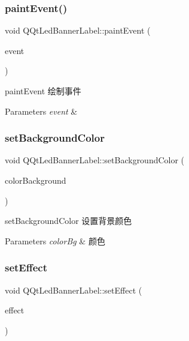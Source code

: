 \subsubsection{\texorpdfstring{paint\+Event()}{paintEvent()}}
{\footnotesize\ttfamily void Q\+Qt\+Led\+Banner\+Label\+::paint\+Event (\begin{DoxyParamCaption}\item[{Q\+Paint\+Event $\ast$}]{event }\end{DoxyParamCaption})\hspace{0.3cm}{\ttfamily [protected]}}



paint\+Event 绘制事件 


\begin{DoxyParams}{Parameters}
{\em event} & \\
\hline
\end{DoxyParams}
\mbox{\label{class_q_qt_led_banner_label_aad9c08b92a1b8f3cdead97dea7ebb286}} 
\subsubsection{\texorpdfstring{set\+Background\+Color}{setBackgroundColor}}
{\footnotesize\ttfamily void Q\+Qt\+Led\+Banner\+Label\+::set\+Background\+Color (\begin{DoxyParamCaption}\item[{Q\+Color}]{color\+Background }\end{DoxyParamCaption})\hspace{0.3cm}{\ttfamily [slot]}}



set\+Background\+Color 设置背景颜色 


\begin{DoxyParams}{Parameters}
{\em color\+Bg} & 颜色 \\
\hline
\end{DoxyParams}
\mbox{\label{class_q_qt_led_banner_label_ac3f7a2d1212e45230f624c1cd594819d}} 
\subsubsection{\texorpdfstring{set\+Effect}{setEffect}}
{\footnotesize\ttfamily void Q\+Qt\+Led\+Banner\+Label\+::set\+Effect (\begin{DoxyParamCaption}\item[{\mbox{\hyperlink{class_q_qt_led_banner_label_a8ea55a34d54e6fe09a74c5fd2d83e5dc}{Effect}}}]{effect }\end{DoxyParamCaption})\hspace{0.3cm}{\ttfamily [slot]}}



